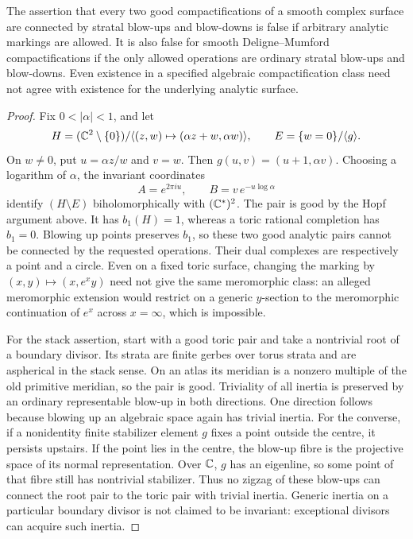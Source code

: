 \begin{proposition}\label{P3a-scope}
The assertion that every two good compactifications of a smooth
complex surface are connected by stratal blow-ups and blow-downs
is false if arbitrary analytic markings are allowed. It is also
false for smooth Deligne--Mumford compactifications if the only
allowed operations are ordinary stratal blow-ups and blow-downs.
Even existence in a specified algebraic compactification class
need not agree with existence for the underlying analytic surface.
\end{proposition}
\begin{proof}
Fix $0<|\alpha|<1$, and let
\[
 H=(\mathbb C^2\setminus\{0\})/
      \langle(z,w)\mapsto(\alpha z+w,\alpha w)\rangle,\qquad
 E=\{w=0\}/\langle g\rangle.
\]
On $w\ne0$, put $u=\alpha z/w$ and $v=w$. Then
$g(u,v)=(u+1,\alpha v)$. Choosing a logarithm of $\alpha$,
the invariant coordinates
\[
 A=e^{2\pi i u},\qquad B=v\,e^{-u\log\alpha}
\]
identify $(H\setminus E)$ biholomorphically with $(\mathbb C^*)^2$.
The pair is good by the Hopf argument above. It has $b_1(H)=1$,
whereas a toric rational completion has $b_1=0$.
Blowing up points preserves $b_1$, so these two good analytic
pairs cannot be connected by the requested operations.
Their dual complexes are respectively a point and a circle.
Even on a fixed toric surface, changing the marking by
$(x,y)\mapsto(x,e^x y)$ need not give the same meromorphic
class: an alleged meromorphic extension would restrict on a
generic $y$-section to the meromorphic continuation of $e^x$
across $x=\infty$, which is impossible.

For the stack assertion, start with a good toric pair and
take a nontrivial root of a boundary divisor. Its strata are
finite gerbes over torus strata and are aspherical in the
stack sense. On an atlas its meridian is a nonzero multiple
of the old primitive meridian, so the pair is good.
Triviality of all inertia is preserved by an ordinary
representable blow-up in both directions. One direction follows
because blowing up an algebraic space again has trivial inertia.
For the converse, if a nonidentity finite stabilizer element $g$
fixes a point outside the centre, it persists upstairs. If the
point lies in the centre, the blow-up fibre is the projective
space of its normal representation. Over $\mathbb C$, $g$ has an
eigenline, so some point of that fibre still has nontrivial
stabilizer. Thus no zigzag of these blow-ups can connect the
root pair to the toric pair with trivial inertia. Generic
inertia on a particular boundary divisor is not claimed to be
invariant: exceptional divisors can acquire such inertia.


\end{proof}
